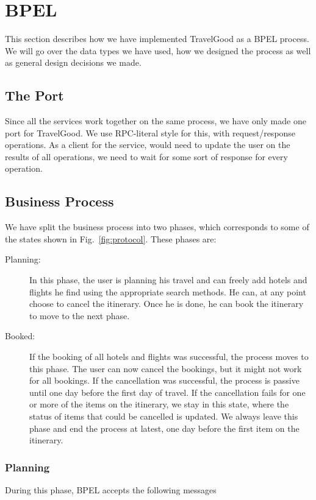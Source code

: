 \section{BPEL}
This section describes how we have implemented TravelGood as a BPEL process. We will go over the data types we have used, how we designed the process as well as general design decisions we made.

\subsection{The Port}
Since all the services work together on the same process, we have only made one port for TravelGood. We use RPC-literal style for this, with request/response operations. As a client for the service, would need to update the user on the results of all operations, we need to wait for some sort of response for every operation.

\subsection{Business Process}
We have split the business process into two phases, which corresponds to some of the states shown in Fig.~\ref{fig:protocol}. These phases are:

\begin{description}
\item [Planning:] In this phase, the user is planning his travel and can freely add hotels and flights he find using the appropriate search methods. He can, at any point choose to cancel the itinerary. Once he is done, he can book the itinerary to move to the next phase.

\item[Booked:] If the booking of all hotels and flights was successful, the process moves to this phase. The user can now cancel the bookings, but it might not work for all bookings. If the cancellation was successful, the process is passive until one day before the first day of travel. If the cancellation fails for one or more of the items on the itinerary, we stay in this state, where the status of items that could be cancelled is updated. We always leave this phase and end the process at latest, one day before the first item on the itinerary.

\end{description}

\subsubsection{Planning}
During this phase, BPEL accepts the following messages

